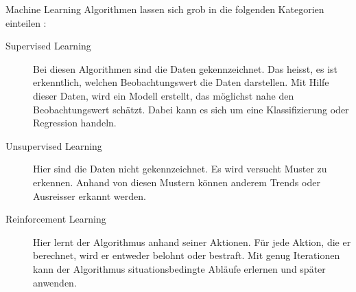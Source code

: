 \begin{samepage}
Machine Learning Algorithmen lassen sich grob in die folgenden Kategorien einteilen \cite{super_unsuper}:
\begin{description}
  \item[Supervised Learning]	Bei diesen Algorithmen sind die Daten gekennzeichnet. Das heisst, es ist erkenntlich, welchen Beobachtungswert die Daten darstellen. Mit Hilfe dieser Daten, wird ein Modell erstellt, das möglichst nahe den Beobachtungswert schätzt. Dabei kann es sich um eine Klassifizierung oder Regression handeln.
  \item[Unsupervised Learning] Hier sind die Daten nicht gekennzeichnet. Es wird versucht Muster zu erkennen. Anhand von diesen Mustern können anderem Trends oder Ausreisser erkannt werden.
  \item[Reinforcement Learning] Hier lernt der Algorithmus anhand seiner Aktionen. Für jede Aktion, die er berechnet, wird er entweder belohnt oder bestraft. Mit genug Iterationen kann der Algorithmus situationsbedingte Abläufe erlernen und später anwenden.
\end{description}
\end{samepage}

